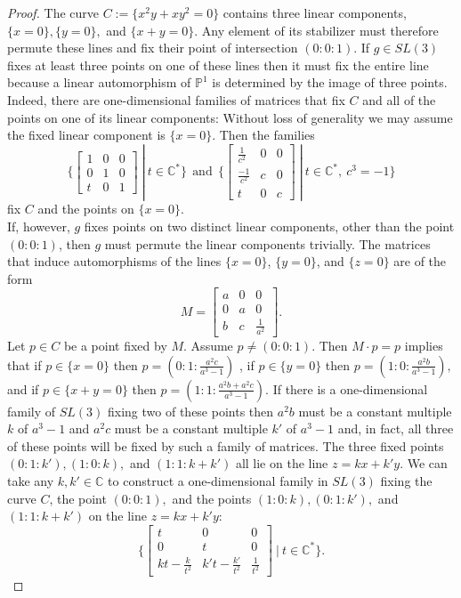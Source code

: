 \documentclass{amsart}
\newcommand{\C}{\mathbb{C}}
\newcommand{\Pj}{\mathbb{P}}
\numberwithin{equation}{section}
\theoremstyle{definition}
\begin{document}
\begin{proof}
    The curve $C:=\{x^2y+xy^2=0\}$ contains three linear components, $\{x=0\}, \{y=0\}, $ and $ \{x+y=0\}$. Any element of its stabilizer must therefore permute these lines and fix their point of intersection $(0:0:1)$. If $g \in SL(3)$ fixes at least three points on one of these lines then it must fix the entire line because a linear automorphism of $\Pj^1$ is determined by the image of three points. Indeed, there are one-dimensional families of matrices that fix $C$ and all of the points on one of its linear components: Without loss of generality we may assume the fixed linear component is $\{x=0\}$. Then the families 
    $$\bigg\{ \begin{bmatrix}
        1 & 0 & 0 \\
        0 & 1 & 0 \\
        t & 0 & 1
    \end{bmatrix} \ | \ t \in \C^* \bigg\} \ \ \text{and} \ \ \bigg\{ \begin{bmatrix}
        \frac{1}{c^2} & 0 & 0 \\
        \frac{-1}{c^2} & c & 0 \\
        t & 0 & c
    \end{bmatrix} \ | \ t \in \C^*, \ c^3=-1\bigg \}$$ fix $C$ and the points on $\{x=0\}$. \\

    If, however, $g$ fixes points on two distinct linear components, other than the point $(0:0:1)$, then $g$ must permute the linear components trivially. The matrices that induce automorphisms of the lines $\{x=0\}$, $\{y=0\}$, and $\{z=0\}$ are of the form
    $$M = \begin{bmatrix}
        a & 0 & 0 \\
        0 & a & 0 \\
        b & c & \frac{1}{a^2}
    \end{bmatrix}.$$
Let $p \in C$ be a point fixed by $M$. Assume $p \neq (0:0:1)$. Then $M\cdot p = p$ implies that if $p \in \{x=0\}$ then $p= (0:1: \frac{a^2c}{a^3-1})$ , if $p \in \{y =0\}$ then $p = (1:0:\frac{a^2b}{a^3-1}),$ and if $p \in \{x+y = 0\}$ then $p = (1:1: \frac{a^2b + a^2c}{a^3-1})$. If there is a one-dimensional family of $SL(3)$  fixing two of these points then $a^2b$ must be a constant multiple $k$ of $a^3-1$ and $a^2c$ must be a constant multiple $k'$ of $a^3-1$ and, in fact, all three of these points will be fixed by such a family of matrices. The three fixed points $(0:1:k'), (1:0:k),$ and $(1:1:k+k')$ all lie on the line $z=kx+k'y$. We can take any $k,k' \in \C$ to construct a one-dimensional family in $SL(3)$ fixing the curve $C$, the point $(0:0:1),$ and the points $ (1:0:k), (0:1:k'),$ and $(1:1:k+k')$ on the line $z=kx+k'y$:
$$\bigg\{ \begin{bmatrix}
    t & 0 & 0 \\
    0 & t & 0 \\
    kt - \frac{k}{t^2} & k't - \frac{k'}{t^2} & \frac{1}{t^2}
\end{bmatrix} \ | \ t \in \C^* \bigg\}.$$


\end{proof}
\end{document}
